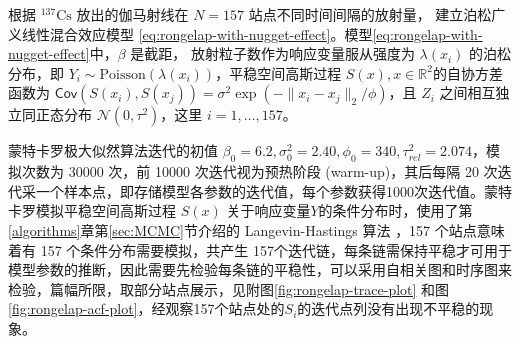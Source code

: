 \documentclass[12pt,a4paper,UTF8,twoside]{book}
\theoremstyle{definition}
\theoremstyle{definition}
\theoremstyle{definition}
\theoremstyle{remark}
\begin{document}
根据 \({}^{137}\mathrm{Cs}\) 放出的伽马射线在 \(N=157\)
站点不同时间间隔的放射量， 建立泊松广义线性混合效应模型
\eqref{eq:rongelap-with-nugget-effect}。模型\eqref{eq:rongelap-with-nugget-effect}中，\(\beta\)
是截距， 放射粒子数作为响应变量服从强度为 \(\lambda(x_i)\)
的泊松分布，即
\(Y_{i} \sim \mathrm{Poisson}( \lambda(x_i) )\)，平稳空间高斯过程
\(S(x),x \in \mathbb{R}^2\)的自协方差函数为
\(\mathsf{Cov}( S(x_i), S(x_j) ) = \sigma^2 \exp( -\|x_i -x_j\|_{2} / \phi )\)，且
\(Z_i\) 之间相互独立同正态分布 \(\mathcal{N}(0,\tau^2)\)，这里
\(i = 1,\ldots, 157\)。

蒙特卡罗极大似然算法迭代的初值
\(\beta_{0} = 6.2,\sigma^2_{0} = 2.40,\phi_{0} = 340,\tau^2_{rel} = 2.074\)，模拟次数为
30000 次，前 10000 次迭代视为预热阶段 (warm-up)，其后每隔 20
次迭代采一个样本点，即存储模型各参数的迭代值，每个参数获得1000次迭代值。蒙特卡罗模拟平稳空间高斯过程
\(S(x)\)
关于响应变量\(Y\)的条件分布时，使用了第\ref{algorithms}章第\ref{sec:MCMC}节介绍的
Langevin-Hastings 算法 \citep{Omiros2003}，157 个站点意味着有 157
个条件分布需要模拟，共产生
157个迭代链，每条链需保持平稳才可用于模型参数的推断，因此需要先检验每条链的平稳性，可以采用自相关图和时序图来检验，篇幅所限，取部分站点展示，见附图\ref{fig:rongelap-trace-plot}
和图
\ref{fig:rongelap-acf-plot}，经观察157个站点处的\(S_i\)的迭代点列没有出现不平稳的现象。
\end{document}
